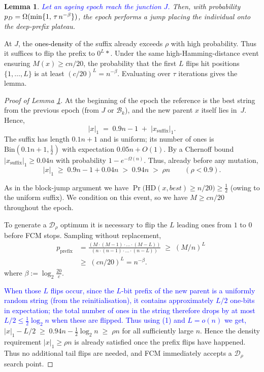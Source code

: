 \documentclass[lettersize,journal]{IEEEtran}
\newcommand{\new}[1]{\textcolor{black}{#1}}
\newtheorem{lemma}{Lemma}
\begin{document}
\begin{lemma} \label{lem:DPO-epoch}
	\textcolor{blue}{Let an ageing epoch reach the junction $J$.} Then, with probability $\new{p_D}=\Omega(\min\{1,\,\tau\,n^{-\beta}\})$, the epoch performs a jump placing the individual onto the deep-prefix plateau.
\end{lemma}

At $J$, the \textcolor{black}{ones-density} of the suffix already exceeds $\rho$ with high probability.
Thus it suffices to flip the prefix to $0^L *$.
Under the same high-Hamming-distance event ensuring $M(x)\ge cn/20$, the probability that the first $L$ flips hit positions $\{1,\dots,L\}$ is at least $(c/20)^L = n^{-\beta}$.
Evaluating over $\tau$ iterations gives the lemma.

\begin{proof}[Proof of Lemma \ref{lem:DPO-epoch}]
	At the beginning of the epoch the reference is the best string from the previous
	epoch (from $J$ or $\mathcal{B}_k$), and the new parent $x$ itself lies in~$J$.
	Hence,
	\[
	|x|_1\;=\;0.9n-1 \;+\; |x_{\text{suffix}}|_1.
	\]
	The suffix has length $0.1n+1$ and is uniform; its number of ones is
	$\mathrm{Bin}(0.1n+1,\tfrac12)$ with expectation $0.05n+O(1)$.
	By a Chernoff bound
	\(
	|x_{\text{suffix}}|_1\ge 0.04n
	\)
	with probability $1-e^{-\Omega(n)}$.
	Thus, already before any mutation,
	\[
	|x|_1
	\;\ge\;
	0.9n-1 + 0.04n
	\;>\;
	0.94n
	\;>\;
	\rho n
	\qquad(\rho<0.9).
	\tag{1}
	\]
	
As in the block-jump argument we have
	\(
	\Pr\!\bigl(\mathrm{HD}(x,best)\ge n/20\bigr)\ge\tfrac12
	\)
	(owing to the uniform suffix). We condition on this event, so we have
	 \(M\ge cn/20\) throughout the epoch.
	
To generate a $\mathcal{D}_\rho$ optimum it is necessary to flip the 
	\(L\) leading ones from $1$ to $0$ before FCM stops.
	Sampling without replacement,
	\begin{align*}
		p_{\text{prefix}}
&=\frac{(M \cdot (M-1)\cdot  ... \cdot (M-L))}{(n \cdot (n-1)\cdot  ... \cdot (n-L))}
		\;\ge\;
		(M/n)^{L}
		\;\\&\ge\;
		(cn/20)^{L}
		=n^{-\beta}.
	\end{align*}
	where $\beta:=\log_{2}\frac{20}{c}$.
	
\textcolor{blue}{When those $L$ flips occur,
	since the $L$-bit prefix of the new parent is a uniformly random string
	(from the reinitialisation), it contains approximately $L/2$ one-bits in
	expectation; the total number of ones in the string therefore drops by at
	most $L/2 \le \tfrac12\log_2 n$ when these are flipped.
	Thus using (1) and $L = o(n)$ we get,}
$|x|_1-L/2\;\ge\;0.94n-\tfrac12\log_2 n
	\;\ge\;\rho n$
for all sufficiently large $n$.
Hence the density requirement \(|x|_1\ge\rho n\) is already satisfied
	once the prefix flips have happened. Thus no additional tail flips are needed, and
	FCM immediately accepts a $\mathcal{D}_\rho$ search point.
	

\end{proof}
\end{document}
